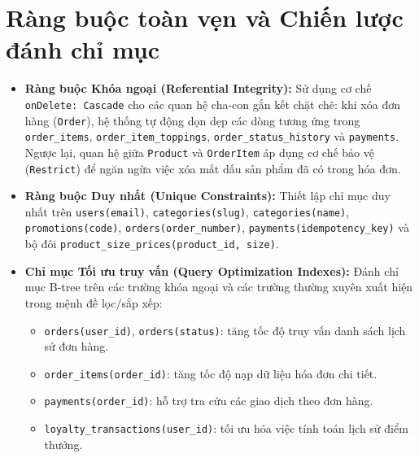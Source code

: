 \documentclass[12pt,a4paper,oneside]{report}
\begin{document}
\section{Ràng buộc toàn vẹn và Chiến lược đánh chỉ mục}
\begin{itemize}
    \item \textbf{Ràng buộc Khóa ngoại (Referential Integrity):} Sử dụng cơ chế \texttt{onDelete: Cascade} cho các quan hệ cha-con gắn kết chặt chẽ: khi xóa đơn hàng (\texttt{Order}), hệ thống tự động dọn dẹp các dòng tương ứng trong \texttt{order\_items}, \texttt{order\_item\_toppings}, \texttt{order\_}\allowbreak\texttt{status\_}\allowbreak\texttt{history} và \texttt{payments}. Ngược lại, quan hệ giữa \texttt{Product} và \texttt{OrderItem} áp dụng cơ chế bảo vệ (\texttt{Restrict}) để ngăn ngừa việc xóa mất dấu sản phẩm đã có trong hóa đơn.
    \item \textbf{Ràng buộc Duy nhất (Unique Constraints):} Thiết lập chỉ mục duy nhất trên \texttt{users(email)}, \texttt{categories(slug)}, \texttt{categories(name)}, \texttt{promotions(code)}, \texttt{orders(order\_number)}, \texttt{payments(idempotency\_key)} và bộ đôi \texttt{product\_size\_prices(product\_id, size)}.
    \item \textbf{Chỉ mục Tối ưu truy vấn (Query Optimization Indexes):} Đánh chỉ mục B-tree trên các trường khóa ngoại và các trường thường xuyên xuất hiện trong mệnh đề lọc/sắp xếp:
    \begin{itemize}
        \item \texttt{orders(user\_id)}, \texttt{orders(status)}: tăng tốc độ truy vấn danh sách lịch sử đơn hàng.
        \item \texttt{order\_items(order\_id)}: tăng tốc độ nạp dữ liệu hóa đơn chi tiết.
        \item \texttt{payments(order\_id)}: hỗ trợ tra cứu các giao dịch theo đơn hàng.
        \item \texttt{loyalty\_transactions(user\_id)}: tối ưu hóa việc tính toán lịch sử điểm thưởng.
    \end{itemize}
\end{itemize}
\end{document}
